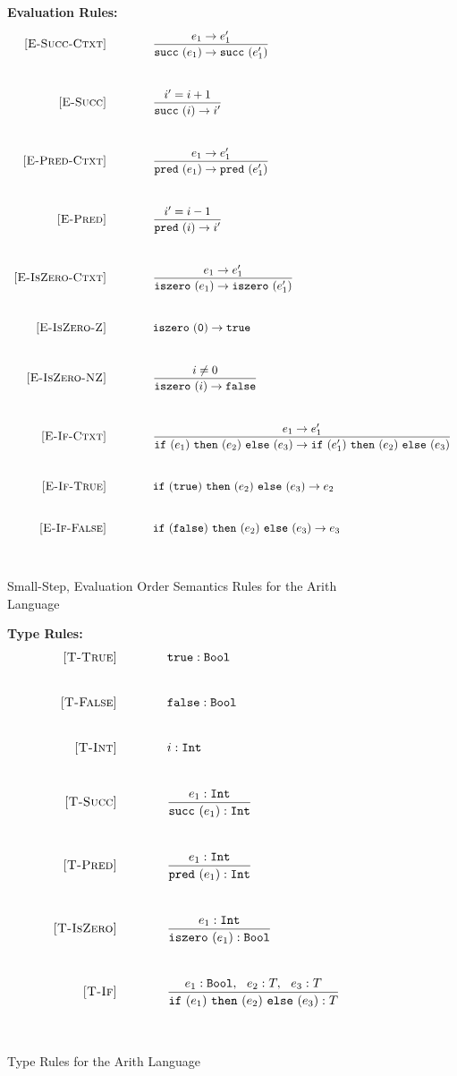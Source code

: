 \documentclass{report}
\newcommand{\rel}[1]{\mbox{\sc [#1]}}
\begin{document}
\newcommand{\ruleNoBar}[2]{
  \rel{#1} &
     \strut\begin{array}{@{}c@{}} #2 \end{array}
   \\~\\~\\
}
\newcommand{\ruleWithBar}[3]{
  \rel{#1} &
  \frac{\strut\begin{array}{@{}c@{}} #2 \end{array}}
       {\strut\begin{array}{@{}c@{}} #3 \end{array}}
   \\~\\~\\
}
\newcommand{\sstep}[2]{{#1} \rightarrow {#2}}
\newcommand{\typeRule}[2]{{#1} : {#2}}


\begin{figure}[H]
{\bf Evaluation Rules:~~~ \fbox{$\sstep{e}{e'}$}} \\
\[
\begin{array}{r@{\qquad\qquad}l}
\ruleWithBar{E-Succ-Ctxt}{
  \sstep{e_1}{e'_1}
}{
  \sstep{\succe {e_1}}{\succe {e'_1}}
}
\ruleWithBar{E-Succ}{
  i' = i + 1
}{
  \sstep{\succe i}{i'}
}
\ruleWithBar{E-Pred-Ctxt}{
  \sstep{e_1}{e'_1}
}{
  \sstep{\prede {e_1}}{\prede {e'_1}}
}
\ruleWithBar{E-Pred}{
  i' = i - 1
}{
  \sstep{\prede i}{i'}
}
\ruleWithBar{E-IsZero-Ctxt}{
  \sstep{e_1}{e'_1}
}{
  \sstep{\iszeroe {e_1}}{\iszeroe {e_1'}}
}
\ruleNoBar{E-IsZero-Z}{
  \sstep{\iszeroe \zero}{\true}
}
\ruleWithBar{E-IsZero-NZ}{
   i \ne 0
}{
  \sstep{\iszeroe i}{\false}
}
\ruleWithBar{E-If-Ctxt}{
  \sstep{e_1}{e'_1}
}{
  \sstep{\ife {e_1} {e_2} {e_3}}{\ife {e'_1} {e_2} {e_3}}
}
\ruleNoBar{E-If-True}{
  \sstep{\ife \true {e_2} {e_3}}{e_2}
}
\ruleNoBar{E-If-False}{
  \sstep{\ife \false {e_2} {e_3}}{e_3}
}
\end{array}
\]
\caption{Small-Step, Evaluation Order Semantics Rules for the Arith Language}\label{fig:arithSmallStepRules}
\end{figure}

\begin{figure}[H]
{\bf Type Rules:~~~ \fbox{$\typeRule{e}{T}$}} \\
\[
\begin{array}{r@{\qquad\qquad}l}
\ruleNoBar{T-True}{
  \typeRule{\true}{\boolt}
}
\ruleNoBar{T-False}{
  \typeRule{\false}{\boolt}
}
\ruleNoBar{T-Int}{
  \typeRule{i}{\intt}
}
\ruleWithBar{T-Succ}{
  \typeRule{e_1}{\intt}
}{
  \typeRule{\succe {e_1}}{\intt}
}
\ruleWithBar{T-Pred}{
  \typeRule{e_1}{\intt}
}{
  \typeRule{\prede {e_1}}{\intt}
}
\ruleWithBar{T-IsZero}{
  \typeRule{e_1}{\intt}
}{
  \typeRule{\iszeroe {e_1}}{\boolt}
}
\ruleWithBar{T-If}{
  \typeRule{e_1}{\boolt},~~\typeRule{e_2}{T},~~\typeRule{e_3}{T}
}{
  \typeRule{\ife {e_1} {e_2} {e_3}}{T}
}
\end{array}
\]
\caption{Type Rules for the Arith Language}\label{fig:arithTypeRules}
\end{figure}
\end{document}
